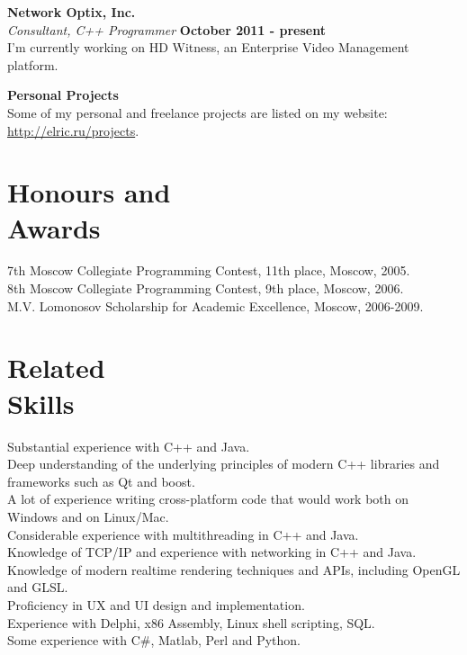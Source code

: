 \documentclass[margin,line]{CV}
\begin{document}
\begin{resume}
    \textbf{Network Optix, Inc.} \vspace{2mm}\\\vspace{1mm}%
    \textsl{Consultant, C++ Programmer} \hfill \textbf{October 2011 - present}\\
    I'm currently working on HD Witness, an Enterprise Video Management platform. 

	\textbf{Personal Projects} \vspace{2mm}\\\vspace{1mm}%
	Some of my personal and freelance projects are listed on my website: \url{http://elric.ru/projects}.

    \section{\mysidestyle Honours and\\Awards}
    7th Moscow Collegiate Programming Contest, 11th place, Moscow, 2005.                            \vspace{1mm}\\%
    8th Moscow Collegiate Programming Contest, 9th place, Moscow, 2006.                             \vspace{1mm}\\%
    M.V. Lomonosov Scholarship for Academic Excellence, Moscow, 2006-2009.


    \section{\mysidestyle Related\\Skills}
    Substantial experience with C++ and Java. \\
	Deep understanding of the underlying principles of modern C++ libraries and frameworks such as Qt and boost. \\
    A lot of experience writing cross-platform code that would work both on Windows and on Linux/Mac. \\
    Considerable experience with multithreading in C++ and Java. \\
    Knowledge of TCP/IP and experience with networking in C++ and Java. \\
    Knowledge of modern realtime rendering techniques and APIs, including OpenGL and GLSL. \\
    Proficiency in UX and UI design and implementation. \\
    Experience with Delphi, x86 Assembly, Linux shell scripting, SQL. \\
    Some experience with C\#, Matlab, Perl and Python. \\



\end{resume}
\end{document}
